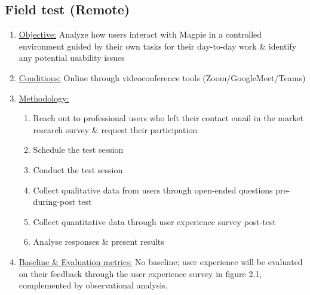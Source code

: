 \documentclass{report}
\begin{document}
\subsection{Field test (Remote)}
\begin{enumerate}
    \item \underline{Objective:} Analyze how users interact with Magpie in a
          controlled environment guided by their own tasks for their day-to-day work
          \& identify any potential usability issues
    \item \underline{Conditions:} Online through videoconference tools
          (Zoom/GoogleMeet/Teams)
    \item \underline{Methodology:}
          \begin{enumerate}
              \item Reach out to professional users who left their contact
                    email in the market research survey \& request their participation
              \item Schedule the test session
              \item Conduct the test session
              \item Collect qualitative data from users through open-ended questions pre-during-post test
              \item Collect quantitative data through user experience survey post-test
              \item Analyse responses \& present results
          \end{enumerate}
    \item \underline{Baseline \& Evaluation metrics:} No baseline; user
          experience will be evaluated on their feedback through the user experience survey in figure 2.1, complemented by observational analysis.
\end{enumerate}
\end{document}
